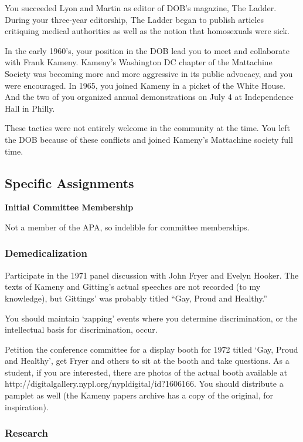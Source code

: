 \begin{refsection}
You succeeded Lyon and Martin as editor of DOB's magazine, The Ladder. During your three-year editorship, The Ladder began to publish articles critiquing medical authorities as well as the notion that homosexuals were sick.

In the early 1960's, your position in the DOB lead you to meet and collaborate with Frank Kameny. Kameny's Washington DC chapter of the Mattachine Society was becoming more and more aggressive in its public advocacy, and you were encouraged. In 1965, you joined Kameny in a picket of the White House. And the two of you organized annual demonstrations on July 4 at Independence Hall in Philly.

These tactics were not entirely welcome in the community at the time. You left the DOB because of these conflicts and joined Kameny's Mattachine society full time.

\subsection{Specific Assignments}
\label{specificassignments}

\textbf{Initial Committee Membership}

Not a member of the APA, so indelible for committee memberships.

\subsubsection{Demedicalization}
\label{demedicalization}

Participate in the 1971 panel discussion with John Fryer and Evelyn Hooker. The texts of Kameny and Gitting's actual speeches are not recorded (to my knowledge), but Gittings' was probably titled “Gay, Proud and Healthy.” 

You should maintain `zapping' events where you determine discrimination, or the intellectual basis for discrimination, occur.

Petition the conference committee for a display booth for 1972 titled `Gay, Proud and Healthy', get Fryer and others to sit at the booth and take questions. As a student, if you are interested, there are photos of the actual booth available at http:\slash \slash digitalgallery.nypl.org\slash nypldigital\slash id?1606166. You should distribute a pamplet as well (the Kameny papers archive has a copy of the original, for inspiration).

\subsubsection{Research}
\label{research}


\end{refsection}
